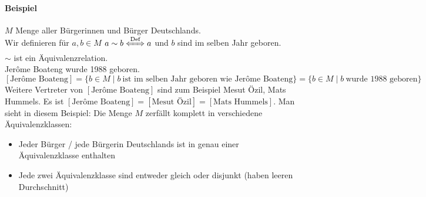 \documentclass[a4paper]{scrartcl}
\theoremstyle{definition}
\theoremstyle{plain}
\theoremstyle{plain}
\theoremstyle{remark}
\theoremstyle{remark}
\theoremstyle{remark}
\theoremstyle{remark}
\theoremstyle{remark}
\begin{document}
\paragraph{Beispiel}
\label{sec-2-5-6-1}
$M$ Menge aller Bürgerinnen und Bürger Deutschlands. \\
     Wir definieren für $a,b\in M$ $a\sim b \xLeftrightarrow{\text{Def}} a$ und $b$ sind im selben Jahr geboren. \\
     $\sim$ ist ein Äquivalenzrelation. \\
     Jerôme Boateng wurde 1988 geboren. \\
     $[\text{Jerôme Boateng}] = \{b\in M\mid b~\text{ist im selben Jahr geboren wie Jerôme Boateng}\} = \{b\in M\mid b~\text{wurde 1988 geboren}\}$
Weitere Vertreter von $[\text{Jerôme Boateng}]$ sind zum Beispiel Mesut Özil, Mats Hummels.
Es ist $[\text{Jerôme Boateng}] = [\text{Mesut Özil}] = [\text{Mats Hummels}]$.
Man sieht in diesem Beispiel: Die Menge $M$ zerfällt komplett in verschiedene Äquivalenzklassen:
\begin{itemize}
\item Jeder Bürger / jede Bürgerin Deutschlands ist in genau einer Äquivalenzklasse enthalten
\item Jede zwei Äquivalenzklasse sind entweder gleich oder disjunkt (haben leeren Durchschnitt)
\end{itemize}
\end{document}
